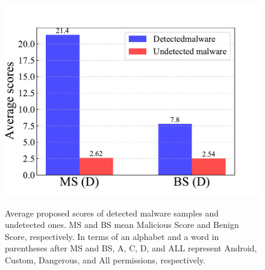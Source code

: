 \documentclass{ieeeaccess}
\begin{document}
\begin{figure}[t]
{    \includegraphics[scale=0.255]{./figures/bar_MS_(D)_BS_(D)_malware.pdf}
  } 
  \caption{Average proposed scores of detected malware samples and undetected ones. MS and BS mean Malicious Score and Benign Score, respectively. In terms of an alphabet and a word in parentheses after MS and BS, A, C, D, and ALL represent Android, Custom, Dangerous, and All permissions, respectively.}
  \label{fig:score_mal}
\end{figure}
\end{document}
